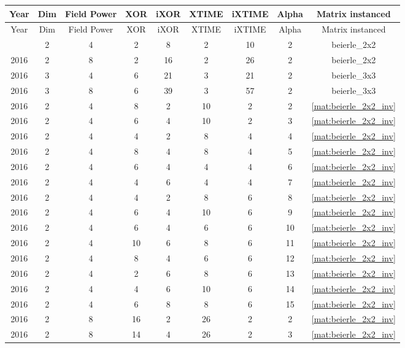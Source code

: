 \begin{longtable}{|c|c|c|c|c|c|c|c|c|}
\hline
Year & Dim & Field Power & XOR & iXOR & XTIME & iXTIME & Alpha & Matrix instanced \\
\hline
\endfirsthead
\hline
Year & Dim & Field Power & XOR & iXOR & XTIME & iXTIME & Alpha & Matrix instanced \\
\hline
\endhead
\hline
\endfoot
2016 & 2 & 4 & 2 & 8 & 2 & 10 & 2 & beierle_2x2 \\ \hline 
2016 & 2 & 8 & 2 & 16 & 2 & 26 & 2 & beierle_2x2 \\ \hline 
2016 & 3 & 4 & 6 & 21 & 3 & 21 & 2 & beierle_3x3 \\ \hline 
2016 & 3 & 8 & 6 & 39 & 3 & 57 & 2 & beierle_3x3 \\ \hline 
2016 & 2 & 4 & 8 & 2 & 10 & 2 & 2 & \eqref{mat:beierle_2x2_inv} \\ \hline 
2016 & 2 & 4 & 6 & 4 & 10 & 2 & 3 & \eqref{mat:beierle_2x2_inv} \\ \hline 
2016 & 2 & 4 & 4 & 2 & 8 & 4 & 4 & \eqref{mat:beierle_2x2_inv} \\ \hline 
2016 & 2 & 4 & 8 & 4 & 8 & 4 & 5 & \eqref{mat:beierle_2x2_inv} \\ \hline 
2016 & 2 & 4 & 6 & 4 & 4 & 4 & 6 & \eqref{mat:beierle_2x2_inv} \\ \hline 
2016 & 2 & 4 & 4 & 6 & 4 & 4 & 7 & \eqref{mat:beierle_2x2_inv} \\ \hline 
2016 & 2 & 4 & 4 & 2 & 8 & 6 & 8 & \eqref{mat:beierle_2x2_inv} \\ \hline 
2016 & 2 & 4 & 6 & 4 & 10 & 6 & 9 & \eqref{mat:beierle_2x2_inv} \\ \hline 
2016 & 2 & 4 & 6 & 4 & 6 & 6 & 10 & \eqref{mat:beierle_2x2_inv} \\ \hline 
2016 & 2 & 4 & 10 & 6 & 8 & 6 & 11 & \eqref{mat:beierle_2x2_inv} \\ \hline 
2016 & 2 & 4 & 8 & 4 & 6 & 6 & 12 & \eqref{mat:beierle_2x2_inv} \\ \hline 
2016 & 2 & 4 & 2 & 6 & 8 & 6 & 13 & \eqref{mat:beierle_2x2_inv} \\ \hline 
2016 & 2 & 4 & 4 & 6 & 10 & 6 & 14 & \eqref{mat:beierle_2x2_inv} \\ \hline 
2016 & 2 & 4 & 6 & 8 & 8 & 6 & 15 & \eqref{mat:beierle_2x2_inv} \\ \hline 
2016 & 2 & 8 & 16 & 2 & 26 & 2 & 2 & \eqref{mat:beierle_2x2_inv} \\ \hline 
2016 & 2 & 8 & 14 & 4 & 26 & 2 & 3 & \eqref{mat:beierle_2x2_inv} \\ \hline 

\end{longtable}
